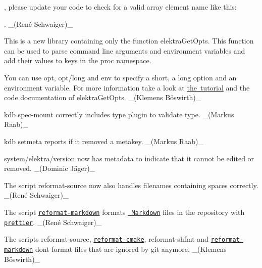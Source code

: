 \begin{DoxyCode}{0}
\end{DoxyCode}


, please update your code to check for a valid array element name like this\+:


\begin{DoxyCode}{0}
\end{DoxyCode}


. \+\_\+(René Schwaiger)\+\_\+


\begin{DoxyItemize}
\item This is a new library containing only the function {\ttfamily elektra\+Get\+Opts}. This function can be used to parse command line arguments and environment variables and add their values to keys in the proc namespace.

You can use {\ttfamily opt}, {\ttfamily opt/long} and {\ttfamily env} to specify a short, a long option and an environment variable. For more information take a look at \mbox{\hyperlink{doc_tutorials_command-line-options_md}{the tutorial}} and the code documentation of {\ttfamily elektra\+Get\+Opts}. \+\_\+(Klemens Böswirth)\+\_\+
\end{DoxyItemize}


\begin{DoxyItemize}
\item {\ttfamily kdb spec-\/mount} correctly includes type plugin to validate {\ttfamily type}. \+\_\+(\+Markus Raab)\+\_\+
\item {\ttfamily kdb setmeta} reports if it removed a metakey. \+\_\+(\+Markus Raab)\+\_\+
\item {\ttfamily system/elektra/version} now has metadata to indicate that it cannot be edited or removed. \+\_\+(Dominic Jäger)\+\_\+
\end{DoxyItemize}


\begin{DoxyItemize}
\item The script {\ttfamily reformat-\/source} now also handles filenames containing spaces correctly. \+\_\+(René Schwaiger)\+\_\+
\item The script \href{https://master.libelektra.org/scripts/dev/reformat-markdown}{\texttt{ {\ttfamily reformat-\/markdown}}} formats \href{https://daringfireball.net/projects/markdown}{\texttt{ Markdown}} files in the repository with \href{https://prettier.io}{\texttt{ {\ttfamily prettier}}}. \+\_\+(René Schwaiger)\+\_\+
\item The scripts {\ttfamily reformat-\/source}, \href{https://master.libelektra.org/scripts/dev/reformat-cmake}{\texttt{ {\ttfamily reformat-\/cmake}}}, {\ttfamily reformat-\/shfmt} and \href{https://master.libelektra.org/scripts/dev/reformat-markdown}{\texttt{ {\ttfamily reformat-\/markdown}}} don\textquotesingle{}t format files that are ignored by git anymore. \+\_\+(Klemens Böswirth)\+\_\+
\end{DoxyItemize}


